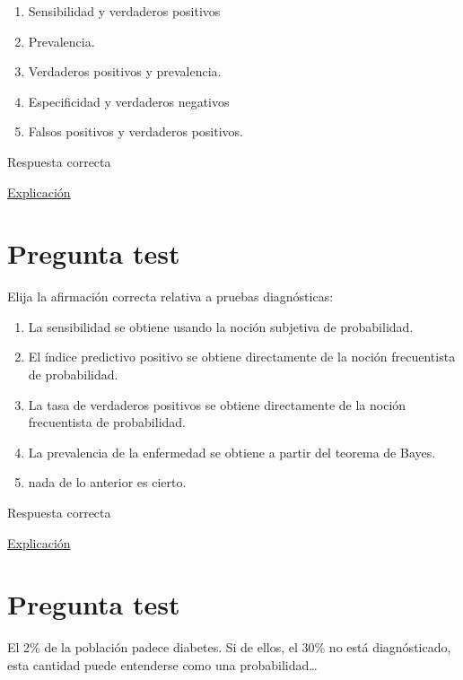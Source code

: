 \documentclass[
]{book}
\providecommand{\tightlist}{%
  \setlength{\itemsep}{0pt}\setlength{\parskip}{0pt}}
\begin{document}
\begin{enumerate}
\def\labelenumi{\alph{enumi})}
\tightlist
\item
  Sensibilidad y verdaderos positivos
\item
  Prevalencia.
\item
  Verdaderos positivos y prevalencia.
\item
  Especificidad y verdaderos negativos
\item
  Falsos positivos y verdaderos positivos.
\end{enumerate}

Respuesta correcta

\href{https://es.wikipedia.org/wiki/Valores_predictivos}{Explicación}

\hypertarget{pregunta-test-174}{%
\section{Pregunta test}\label{pregunta-test-174}}

Elija la afirmación correcta relativa a pruebas diagnósticas:

\begin{enumerate}
\def\labelenumi{\alph{enumi})}
\tightlist
\item
  La sensibilidad se obtiene usando la noción subjetiva de probabilidad.
\item
  El índice predictivo positivo se obtiene directamente de la noción frecuentista de probabilidad.
\item
  La tasa de verdaderos positivos se obtiene directamente de la noción frecuentista de probabilidad.
\item
  La prevalencia de la enfermedad se obtiene a partir del teorema de Bayes.
\item
  nada de lo anterior es cierto.
\end{enumerate}

Respuesta correcta

\href{https://1fjmanzano.github.io/bioestadistica/relaci\%C3\%B3n-entre-variables-cualitativas.html\#diagno\%CC\%81stico-cli\%CC\%81nico}{Explicación}

\hypertarget{pregunta-test-175}{%
\section{Pregunta test}\label{pregunta-test-175}}

El 2\% de la población padece diabetes. Si de ellos, el 30\% no está diagnósticado, esta cantidad puede entenderse como una probabilidad\ldots{}
\end{document}
